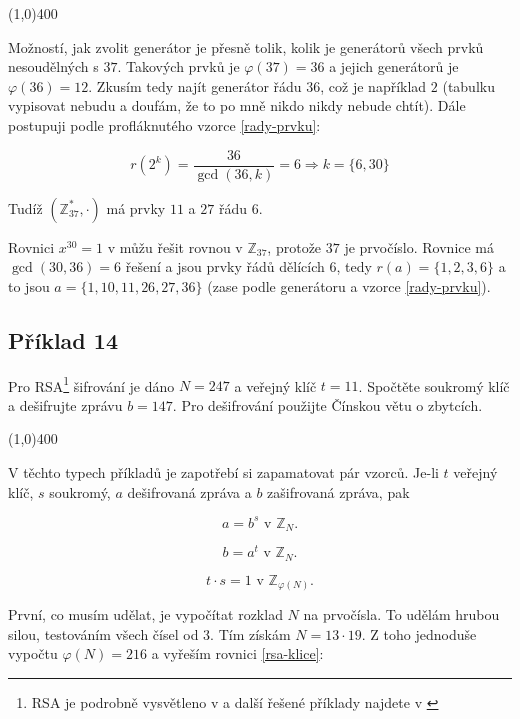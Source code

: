 \documentclass{article}
\begin{document}
\line(1,0){400}

Možností, jak zvolit generátor je přesně tolik, kolik je generátorů všech prvků nesoudělných s $37$. Takových prvků je $\varphi(37) = 36$ a jejich generátorů je $\varphi(36) = 12$. Zkusím tedy najít generátor řádu $36$, což je například $2$ (tabulku vypisovat nebudu a doufám, že to po mně nikdo nikdy nebude chtít). Dále postupuji podle profláknutého vzorce \ref{rady-prvku}:

\[ r(2^k) = \frac{36}{\gcd(36,k)} = 6 \Rightarrow k = \{6,30\} \]

Tudíž $(\mathbb{Z}_{37}^*, \cdot)$ má prvky $11$ a $27$ řádu $6$.

Rovnici $x^{30} = 1$ v můžu řešit rovnou v $\mathbb{Z}_{37}$, protože $37$ je prvočíslo. Rovnice má $\gcd(30,36) = 6$ řešení a jsou prvky řádů dělících $6$, tedy $r(a) = \{1,2,3,6\}$ a to jsou $a = \{1,10,11,26,27,36\}$ (zase podle generátoru a vzorce \ref{rady-prvku}). 

\subsection{\label{priklad1-14}Příklad 14}
Pro RSA\footnote{RSA je podrobně vysvětleno v \cite[str. 92]{velebil07} a další řešené příklady najdete v \cite[str. 23]{dma07}} šifrování je dáno $N = 247$ a veřejný klíč $t = 11$. Spočtěte soukromý klíč a dešifrujte zprávu $b = 147$. Pro dešifrování použijte Čínskou větu o zbytcích.

\line(1,0){400}

V těchto typech příkladů je zapotřebí si zapamatovat pár vzorců. Je-li $t$ veřejný klíč, $s$ soukromý, $a$ dešifrovaná zpráva a $b$ zašifrovaná zpráva, pak

\begin{equation}
	 a = b^s \mbox{ v } \mathbb{Z}_N.
	 \label{rsa-odsifrovani}
\end{equation}
 
\begin{equation}
	 b = a^t \mbox{ v } \mathbb{Z}_N.
\end{equation}

\begin{equation}
	 t\cdot s = 1 \mbox{ v } \mathbb{Z}_{\varphi(N)}.
	\label{rsa-klice}
\end{equation}

První, co musím udělat, je vypočítat rozklad $N$ na prvočísla. To udělám hrubou silou, testováním všech čísel od $3$. Tím získám $N = 13\cdot19$. Z toho jednoduše vypočtu $\varphi(N) = 216$ a vyřeším rovnici \ref{rsa-klice}:
\end{document}
